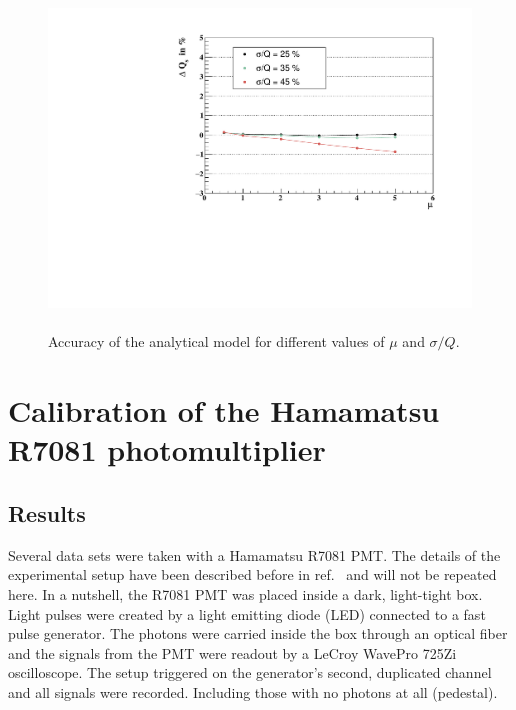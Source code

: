 \documentclass[preprint,12pt]{elsarticle}
\begin{document}
\begin{figure}[!t]
\centering
\includegraphics[width=12.0cm, height=8.25cm]{figures/DQs.pdf} \\
\caption{ Accuracy of the analytical model for different values of $\mu$ and $\sigma/Q$. }
\label{fig:dev}
\end{figure}


\section{Calibration of the Hamamatsu R7081 photomultiplier}
\label{sec:res}

\subsection{Results}

Several data sets were taken with a Hamamatsu R7081 PMT. 
The details of the experimental setup have been described before in ref.~\cite{me} and will not be repeated here. 
In a nutshell, the R7081 PMT was placed inside a dark, light-tight box. Light pulses were created by a light emitting diode (LED) connected to a fast pulse generator. 
The photons were carried inside the box through an optical fiber and the signals from the PMT were readout by a LeCroy WavePro 725Zi oscilloscope.   
The setup triggered on the generator's second, duplicated channel and all signals were recorded. Including those with no photons at all (pedestal). 
\end{document}
